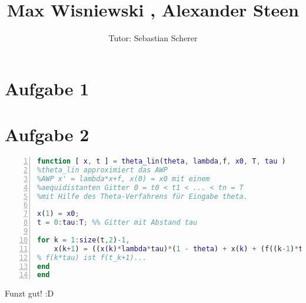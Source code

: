 \documentclass[11pt,a4paper,ngerman]{article}
\author{Tutor: Sebastian Scherer}
\date{}
\title{Max Wisniewski , Alexander Steen}
\begin{document}

\maketitle
\thispagestyle{fancy}



\section*{Aufgabe 1}

\section*{Aufgabe 2}

\begin{lstlisting}[language=matlab, numbers=left]
function [ x, t ] = theta_lin(theta, lambda,f, x0, T, tau )
%theta_lin approximiert das AWP
%AWP x' = lambda*x+f, x(0) = x0 mit einem
%aequidistanten Gitter 0 = t0 < t1 < ... < tn = T
%mit Hilfe des Theta-Verfahrens für Eingabe theta.

x(1) = x0;
t = 0:tau:T; %% Gitter mit Abstand tau

for k = 1:size(t,2)-1,
    x(k+1) = ((x(k)*lambda*tau)*(1 - theta) + x(k) + (f((k-1)*tau)*tau)*(1+theta)+ theta*tau*f(k*tau))/(1-tau*lambda*theta);
% f(k*tau) ist f(t_k+1)...
end
end
\end{lstlisting}

Funzt gut! :D





\label{LastPage}
\end{document}
